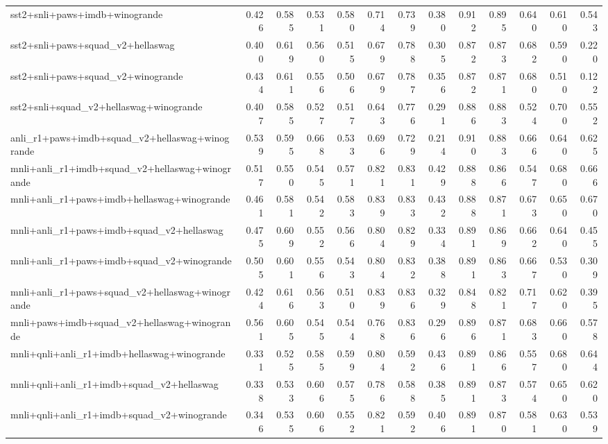 \begin{table}[t]
\begin{tabular}{lrrrrrrrrrrrr}
    sst2+snli+paws+imdb+winogrande & 0.426 & 0.585 & 0.531 & 0.580 & 0.714 & 0.739 & 0.380 & 0.912 & 0.895 & 0.640 & 0.610 & 0.543 \\
    sst2+snli+paws+squad\_v2+hellaswag & 0.400 & 0.619 & 0.560 & 0.515 & 0.679 & 0.788 & 0.305 & 0.872 & 0.873 & 0.682 & 0.590 & 0.220 \\
    sst2+snli+paws+squad\_v2+winogrande & 0.434 & 0.611 & 0.556 & 0.506 & 0.679 & 0.787 & 0.356 & 0.872 & 0.871 & 0.680 & 0.510 & 0.122 \\
    sst2+snli+squad\_v2+hellaswag+winogrande & 0.407 & 0.585 & 0.527 & 0.517 & 0.643 & 0.776 & 0.291 & 0.886 & 0.883 & 0.524 & 0.700 & 0.552 \\
    \addlinespace
    anli\_r1+paws+imdb+squad\_v2+hellaswag+winogrande & 0.539 & 0.595 & 0.668 & 0.533 & 0.696 & 0.729 & 0.214 & 0.910 & 0.883 & 0.666 & 0.640 & 0.625 \\
    mnli+anli\_r1+imdb+squad\_v2+hellaswag+winogrande & 0.517 & 0.550 & 0.545 & 0.571 & 0.821 & 0.831 & 0.429 & 0.888 & 0.866 & 0.547 & 0.680 & 0.666 \\
    mnli+anli\_r1+paws+imdb+hellaswag+winogrande & 0.461 & 0.581 & 0.542 & 0.583 & 0.839 & 0.833 & 0.432 & 0.888 & 0.871 & 0.673 & 0.650 & 0.670 \\
    mnli+anli\_r1+paws+imdb+squad\_v2+hellaswag & 0.475 & 0.609 & 0.552 & 0.566 & 0.804 & 0.829 & 0.334 & 0.891 & 0.869 & 0.662 & 0.640 & 0.455 \\
    mnli+anli\_r1+paws+imdb+squad\_v2+winogrande & 0.505 & 0.601 & 0.556 & 0.543 & 0.804 & 0.832 & 0.388 & 0.891 & 0.863 & 0.667 & 0.530 & 0.309 \\
    mnli+anli\_r1+paws+squad\_v2+hellaswag+winogrande & 0.424 & 0.616 & 0.563 & 0.510 & 0.839 & 0.836 & 0.329 & 0.848 & 0.821 & 0.717 & 0.620 & 0.395 \\
    mnli+paws+imdb+squad\_v2+hellaswag+winogrande & 0.561 & 0.605 & 0.545 & 0.544 & 0.768 & 0.836 & 0.296 & 0.896 & 0.871 & 0.683 & 0.660 & 0.578 \\
    mnli+qnli+anli\_r1+imdb+hellaswag+winogrande & 0.331 & 0.525 & 0.585 & 0.599 & 0.804 & 0.592 & 0.436 & 0.891 & 0.866 & 0.557 & 0.680 & 0.644 \\
    mnli+qnli+anli\_r1+imdb+squad\_v2+hellaswag & 0.338 & 0.533 & 0.606 & 0.575 & 0.786 & 0.588 & 0.385 & 0.891 & 0.873 & 0.574 & 0.650 & 0.620 \\
    mnli+qnli+anli\_r1+imdb+squad\_v2+winogrande & 0.346 & 0.535 & 0.606 & 0.552 & 0.821 & 0.592 & 0.406 & 0.891 & 0.870 & 0.581 & 0.630 & 0.539 \\

\end{tabular}
\end{table}
